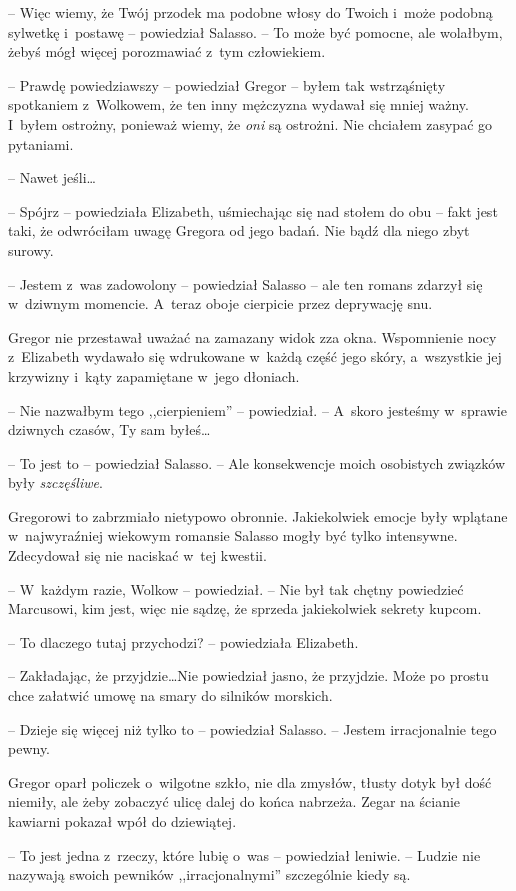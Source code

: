 \documentclass[oneside,polish,12pt,sfheadings]{mwbk}
\begin{document}
-- Więc wiemy, że Twój przodek ma podobne włosy do Twoich i~może podobną
sylwetkę i~postawę -- powiedział Salasso. -- To może być pomocne, ale
wolałbym, żebyś mógł więcej porozmawiać z~tym człowiekiem.

-- Prawdę powiedziawszy -- powiedział Gregor -- byłem tak wstrząśnięty
spotkaniem z~Wolkowem, że ten inny mężczyzna wydawał się mniej ważny. I~byłem ostrożny, ponieważ wiemy, że \emph{oni} są ostrożni. Nie chciałem
zasypać go pytaniami.

-- Nawet jeśli\ldots

-- Spójrz -- powiedziała Elizabeth, uśmiechając się nad stołem do obu --
fakt jest taki, że odwróciłam uwagę Gregora od jego badań. Nie bądź dla
niego zbyt surowy.

-- Jestem z~was zadowolony -- powiedział Salasso -- ale ten romans zdarzył
się w~dziwnym momencie. A~teraz oboje cierpicie przez deprywację snu.

Gregor nie przestawał uważać na zamazany widok zza okna. Wspomnienie
nocy z~Elizabeth wydawało się wdrukowane w~każdą część jego skóry, a~wszystkie jej krzywizny i~kąty zapamiętane w~jego dłoniach.

-- Nie nazwałbym tego ,,cierpieniem'' -- powiedział. -- A~skoro jesteśmy w~sprawie dziwnych czasów, Ty sam byłeś\ldots

-- To jest to -- powiedział Salasso. -- Ale konsekwencje moich osobistych
związków były \emph{szczęśliwe}.

Gregorowi to zabrzmiało nietypowo obronnie. Jakiekolwiek emocje były
wplątane w~najwyraźniej wiekowym romansie Salasso mogły być tylko
intensywne. Zdecydował się nie naciskać w~tej kwestii.

-- W~każdym razie, Wolkow -- powiedział. -- Nie był tak chętny powiedzieć
Marcusowi, kim jest, więc nie sądzę, że sprzeda jakiekolwiek sekrety
kupcom.

-- To dlaczego tutaj przychodzi? -- powiedziała Elizabeth.

-- Zakładając, że przyjdzie\ldots Nie powiedział jasno, że przyjdzie. Może
po prostu chce załatwić umowę na smary do silników morskich.

-- Dzieje się więcej niż tylko to -- powiedział Salasso. -- Jestem
irracjonalnie tego pewny.

Gregor oparł policzek o~wilgotne szkło, nie dla zmysłów, tłusty dotyk
był dość niemiły, ale żeby zobaczyć ulicę dalej do końca nabrzeża. Zegar
na ścianie kawiarni pokazał wpół do dziewiątej.

-- To jest jedna z~rzeczy, które lubię o~was -- powiedział leniwie. --
Ludzie nie nazywają swoich pewników ,,irracjonalnymi'' szczególnie kiedy
są.
\end{document}
